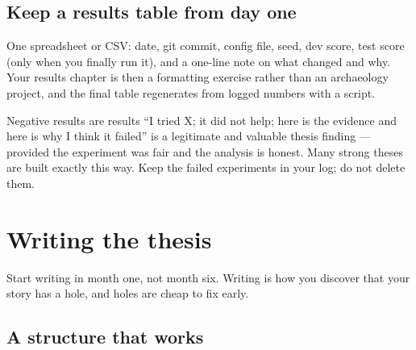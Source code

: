 \documentclass[11pt,a4paper]{article}
\begin{document}
\subsection{Keep a results table from day one}

One spreadsheet or CSV: date, git commit, config file, seed, dev score, test
score (only when you finally run it), and a one-line note on what changed and
why. Your results chapter is then a formatting exercise rather than an
archaeology project, and the final table regenerates from logged numbers with a
script.

\begin{cbox}{Negative results are results}
``I tried X; it did not help; here is the evidence and here is why I think it
failed'' is a legitimate and valuable thesis finding --- provided the
experiment was fair and the analysis is honest. Many strong theses are built
exactly this way. Keep the failed experiments in your log; do not delete them.
\end{cbox}

\section{Writing the thesis}

Start writing in month one, not month six. Writing is how you discover that
your story has a hole, and holes are cheap to fix early.

\subsection{A structure that works}
\end{document}
